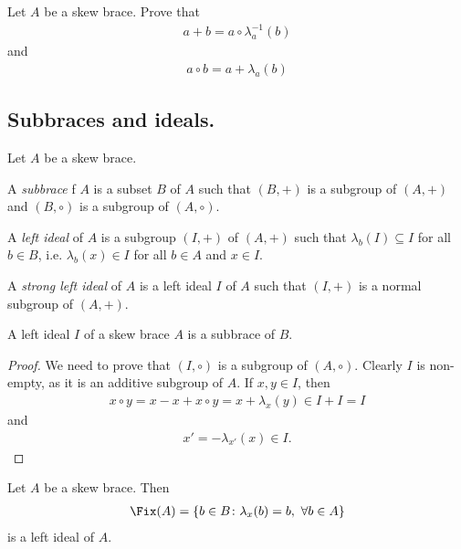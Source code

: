     \begin{exercise}\label{ex:sumprod}
        Let $A$ be a skew brace. Prove that 
        \begin{align*}
            a+b = a\circ\lambda^{-1}_{a}(b)
        \end{align*}
        and
        \begin{align*}
            a\circ b = a + \lambda_a(b)
        \end{align*}
    \end{exercise}


\subsection{Subbraces and ideals.}

    \begin{definition}
        Let $A$ be a skew brace. 

        A \emph{subbrace} f $A$ is a subset $B$ of $A$ such
        that $(B,+)$ is a subgroup of $(A,+)$ and $(B,\circ)$ is a subgroup of $(A,\circ)$.

        A \emph{left ideal} of $A$ is a subgroup $(I,+)$ of $(A,+)$ such that $\lambda_b(I) \subseteq I$ for all $b\in B$, i.e. $\lambda_b(x)\in I$ for all $b\in A$ and $x\in I$.

        A \emph{strong left ideal} of $A$ is a left ideal $I$ of $A$ such that $(I,+)$ is a normal subgroup of $(A,+)$.
    \end{definition}

    \begin{lemma}
        A left ideal $I$ of a skew brace $A$ is a subbrace of $B$.
    \end{lemma}

    \begin{proof}
        We need to prove that $(I,\circ)$ is a subgroup of $(A,\circ)$. 
        Clearly $I$ is non-empty, as it is an additive subgroup of $A$. 
        If $x,y\in I$, then 
        \begin{align*}
            x\circ y = x - x+ x\circ y = x+\lambda_x(y) \in I + I = I
        \end{align*}
        and
        \begin{align*}
            x'=-\lambda_{x'}(x) \in I. 
        \end{align*}
    \end{proof}

    \begin{exercise}
    Let $A$ be a skew brace. Then
    \begin{align*}
        \Fix(A) = \{b \in B\colon \lambda_x(b)=b,\ \forall b\in A\}
    \end{align*}
    is a left ideal of $A$.
    \end{exercise}

